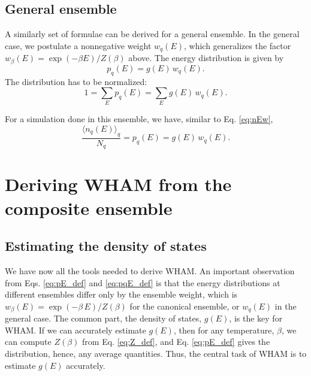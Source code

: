 \documentclass[aip,jcp,preprint,superscriptaddress]{revtex4-1}
\begin{document}
\subsection{General ensemble}



A similarly set of formulae
can be derived for a general ensemble.
%
In the general case,
we postulate a nonnegative weight $w_q(E)$,
which generalizes the factor $w_\beta(E) = \exp(-\beta E)/Z(\beta)$ above.
%
The energy distribution is given by
%
\begin{equation}
  p_q(E) = g(E) \, w_q(E).
  \label{eq:pqE_def}
\end{equation}
%
The distribution
has to be normalized:
\begin{equation}
  1 = \sum_E p_q(E)
  = \sum_E g(E) \, w_q(E).
  \label{eq:pqE_normalization}
\end{equation}


For a simulation done in this ensemble,
we have, similar to Eq. \eqref{eq:nEw},
\begin{equation}
  \frac{ \langle n_q(E) \rangle_q } { N_q }
= p_q(E)
= g(E) \, w_q(E).
  \label{eq:nqE}
\end{equation}





\section{\label{sec:WHAM_compens}
Deriving WHAM from the composite ensemble}



\subsection{Estimating the density of states}


We have now all the tools needed to derive WHAM.
%
An important observation from
Eqs. \eqref{eq:pE_def} and \eqref{eq:pqE_def}
is that
the energy distributions at different ensembles
differ only by the ensemble weight,
which is $w_\beta(E) = \exp(-\beta \, E) / Z(\beta)$
for the canonical ensemble,
or $w_q(E)$ in the general case.
%
The common part, the density of states,
$g(E)$, is the key for WHAM.
%
If we can accurately estimate $g(E)$,
then for any temperature, $\beta$,
we can compute $Z(\beta)$ from Eq. \eqref{eq:Z_def},
and Eq. \eqref{eq:pE_def} gives the distribution,
hence, any average quantities.
%
Thus,
the central task of WHAM
is to estimate $g(E)$ accurately.
\end{document}
